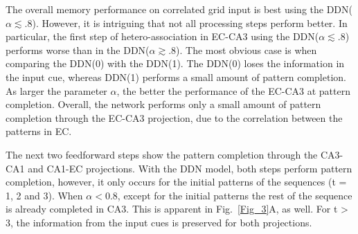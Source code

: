 \documentclass[utf8]{frontiersSCNS} %
\begin{document}

The overall memory performance on correlated grid input is best using the DDN($\alpha \lesssim .8$). 
%
 However, it is intriguing that not all processing steps perform better. 
In particular, the first step of hetero-association in EC-CA3 using the DDN($\alpha \lesssim .8$) performs worse than in the DDN($\alpha \gtrsim .8$). The most obvious case is when comparing the DDN(0) with  the DDN(1).
%
The DDN(0) loses the information in the input cue, whereas DDN(1) performs a small amount of pattern completion.
%
As larger the parameter $\alpha$, the better the performance of the EC-CA3 at pattern completion.
%
Overall, the network performs only a small amount of pattern completion through the EC-CA3 projection, due to the correlation between the patterns in EC.
%

The next two feedforward steps show the pattern completion through the CA3-CA1 and CA1-EC projections. With the DDN model, both steps perform pattern completion, however, it only occurs for the initial patterns of the sequences (t = 1, 2 and 3). When $\alpha < 0.8$, except for the initial patterns the rest of the sequence is already completed in CA3. This is apparent in Fig.~\ref{Fig_3}A, as well.
%
For t > 3, the information from the input cues is preserved for both projections.
%
\end{document}
